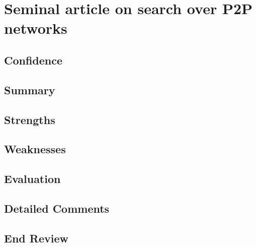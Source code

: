
\section{Seminal article on search over P2P networks}

\cite{Yang02improvingsearch}

\subsection{Confidence}

\subsection{Summary}

\subsection{Strengths}

\subsection{Weaknesses}

\subsection{Evaluation}

\subsection{Detailed Comments}

\subsection*{End Review}
